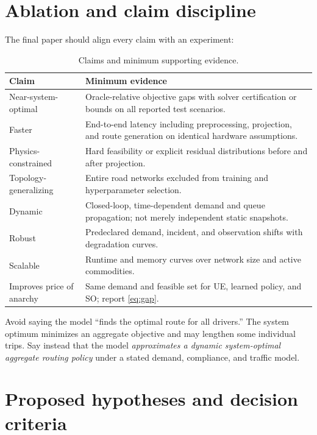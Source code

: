 \documentclass[11pt]{article}
\begin{document}
\section{Ablation and claim discipline}

The final paper should align every claim with an experiment:

\begin{table}[ht]
\centering
\caption{Claims and minimum supporting evidence.}
\label{tab:claims}
\begin{tabularx}{\textwidth}{@{}p{}X@{}}
\toprule
Claim & Minimum evidence \\
\midrule
Near-system-optimal & Oracle-relative objective gaps with solver certification or bounds on all reported test scenarios. \\
Faster & End-to-end latency including preprocessing, projection, and route generation on identical hardware assumptions. \\
Physics-constrained & Hard feasibility or explicit residual distributions before and after projection. \\
Topology-generalizing & Entire road networks excluded from training and hyperparameter selection. \\
Dynamic & Closed-loop, time-dependent demand and queue propagation; not merely independent static snapshots. \\
Robust & Predeclared demand, incident, and observation shifts with degradation curves. \\
Scalable & Runtime and memory curves over network size and active commodities. \\
Improves price of anarchy & Same demand and feasible set for UE, learned policy, and SO; report \cref{eq:gap}. \\
\bottomrule
\end{tabularx}
\end{table}

Avoid saying the model ``finds the optimal route for all drivers.''  The system optimum
minimizes an aggregate objective and may lengthen some individual trips.  Say instead
that the model \emph{approximates a dynamic system-optimal aggregate routing policy}
under a stated demand, compliance, and traffic model.

\section{Proposed hypotheses and decision criteria}
\end{document}
